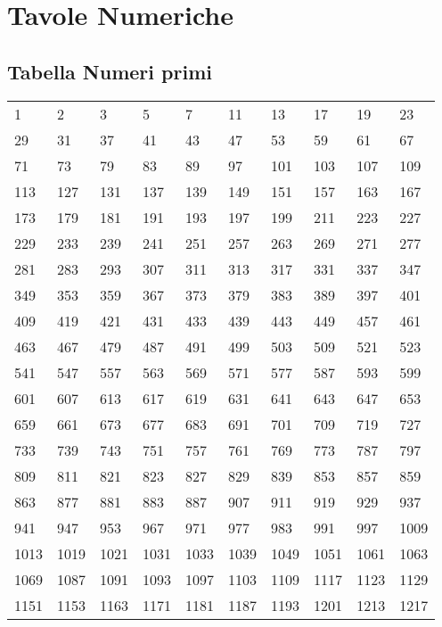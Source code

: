 \chapter{Tavole Numeriche}
\label{sec:TabelleNumeriche}
\minitoc
\mtcskip                                %
\minilof                                %
\mtcskip                                %
\minilot
\section{Tabella Numeri primi}
\label{sec:TabellaNumeriPrrimi}
\begin{table}[H]
\centering
\begin{tabular}{llllllllll}
1 &2 &3 &5 &7 &11 &13 &17 &19 &23 \\
29 &31 &37 &41 &43 &47 &53 &59 &61 &67 \\
71 &73 &79 &83 &89 &97 &101 &103 &107 &109 \\
113 &127 &131 &137 &139 &149 &151 &157 &163 &167 \\
173 &179 &181 &191 &193 &197 &199 &211 &223 &227 \\
229 &233 &239 &241 &251 &257 &263 &269 &271 &277 \\
281 &283 &293 &307 &311 &313 &317 &331 &337 &347 \\
349 &353 &359 &367 &373 &379 &383 &389 &397 &401 \\
409 &419 &421 &431 &433 &439 &443 &449 &457 &461 \\
463 &467 &479 &487 &491 &499 &503 &509 &521 &523 \\
541 &547 &557 &563 &569 &571 &577 &587 &593 &599 \\
601 &607 &613 &617 &619 &631 &641 &643 &647 &653 \\
659 &661 &673 &677 &683 &691 &701 &709 &719 &727 \\
733 &739 &743 &751 &757 &761 &769 &773 &787 &797 \\
809 &811 &821 &823 &827 &829 &839 &853 &857 &859 \\
863 &877 &881 &883 &887 &907 &911 &919 &929 &937 \\
941 &947 &953 &967 &971 &977 &983 &991 &997 &1009 \\
1013 &1019 &1021 &1031 &1033 &1039 &1049 &1051 &1061 &1063 \\
1069 &1087 &1091 &1093 &1097 &1103 &1109 &1117 &1123 &1129 \\
1151 &1153 &1163 &1171 &1181 &1187 &1193 &1201 &1213 &1217 \\

\end{tabular}
\end{table}
